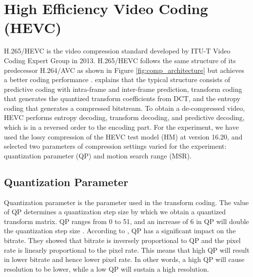 \section{High Efficiency Video Coding (HEVC)}
\label{sec:background/section_c}

H.265/HEVC is the video compression standard developed by ITU-T Video Coding Expert Group in 2013. H.265/HEVC follows the same structure of its predecessor H.264/AVC as shown in Figure \ref{fig:comp_architecture} but achieves a better coding performance \cite{zhang_overview_2019}. \citeauthor{zhang_overview_2019} explains that the typical structure consists of predictive coding with intra-frame and inter-frame prediction, transform coding that generates the quantized transform coefficients from DCT, and the entropy coding that generates a compressed bitstream. To obtain a de-compressed video, HEVC performs entropy decoding, transform decoding, and predictive decoding, which is in a reversed order to the encoding part. For the experiment, we have used the lossy compression of the HEVC test model (HM) at version 16.20, and selected two parameters of compression settings varied for the experiment: quantization parameter (QP) and motion search range (MSR).

\subsection{Quantization Parameter}
\label{subsec:background/section_c/qp}
Quantization parameter is the parameter used in the transform coding. The value of QP determines a quantization step size by which we obtain a quantized transform matrix. QP ranges from 0 to 51, and an increase of 6 in QP will double the quantization step size \cite{sullivan_overview_2012} \cite{budagavi_hevc_2014}. According to \cite{sharrab_modeling_2017}, QP has a significant impact on the bitrate. They showed that bitrate is inversely proportional to QP and the pixel rate is linearly proportional to the pixel rate. This means that high QP will result in lower bitrate and hence lower pixel rate. In other words, a high QP will cause resolution to be lower, while a low QP will sustain a high resolution.

